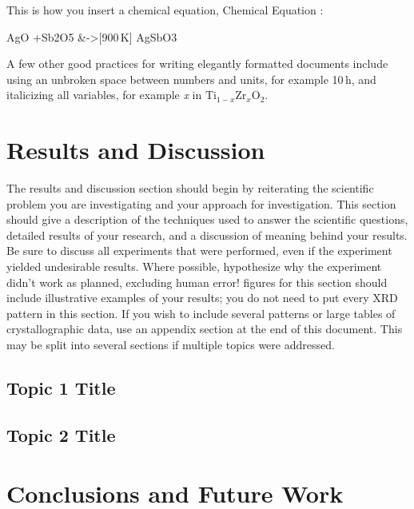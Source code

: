 \documentclass[12pt]{article}
\begin{document}
This is how you insert a chemical equation, Chemical Equation :

\begin{reactions}
	AgO +Sb2O5 &->[900\,K] AgSbO3
\end{reactions}

A few other good practices for writing elegantly formatted documents include using an unbroken space between numbers and units, for example 10\,h, and italicizing all variables, for example \textit{x} in Ti$_{1-x}$Zr$_x$O$_2$.


\section{Results and Discussion}

The results and discussion section should begin by reiterating the scientific problem you are investigating and your approach for investigation. This section should give a description of the techniques used to answer the scientific questions, detailed results of your research, and a discussion of meaning behind your results. Be sure to discuss all experiments that were performed, even if the experiment yielded undesirable results. Where possible, hypothesize why the experiment didn't work as planned, excluding human error! figures for this section should include illustrative examples of your results; you do not need to put every XRD pattern in this section. If you wish to include several patterns or large tables of crystallographic data, use an appendix section at the end of this document. This may be split into several sections if multiple topics were addressed. 

\subsection{Topic 1 Title}

\subsection{Topic 2 Title}

\section{Conclusions and Future Work}
\end{document}
